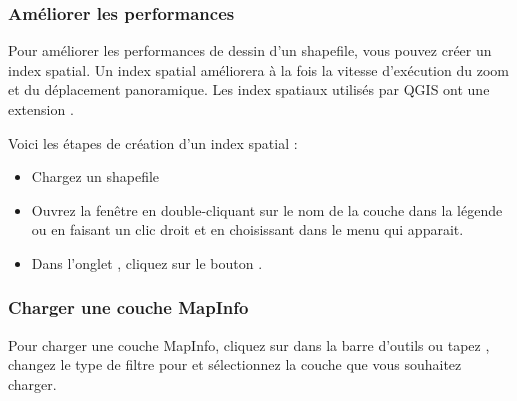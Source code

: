 \subsubsection{Améliorer les performances}

Pour améliorer les performances de dessin d'un shapefile, vous pouvez créer un index spatial. Un  index spatial améliorera à la fois la vitesse d'exécution du zoom et du déplacement panoramique. Les index spatiaux utilisés par QGIS ont une extension .

Voici les étapes de création d'un index spatial :

\begin{itemize}
\item Chargez un shapefile
\item Ouvrez la fenêtre  en double-cliquant sur le nom de la couche dans la légende ou en faisant un clic droit et en choisissant  dans le menu qui apparait.
\item Dans l'onglet , cliquez sur le bouton .
\end{itemize}

\subsubsection{Charger une couche MapInfo}

Pour charger une couche MapInfo, cliquez sur  dans la barre d'outils ou tapez , changez le type de filtre pour  et sélectionnez la couche que vous souhaitez charger.

